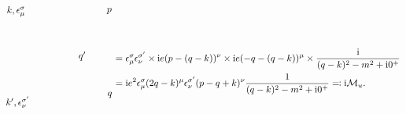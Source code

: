 \begin{equation}
\begin{gathered}
\begin{tikzpicture}[x=0.75pt,y=0.75pt,yscale=-1,xscale=1]
            \draw (257,73.27) node [anchor=south west] [inner sep=0.75pt]    {$p$};
            \draw (258,181.57) node [anchor=north west][inner sep=0.75pt]    {$q$};
            \draw (217,124.4) node [anchor=north west][inner sep=0.75pt]    {$q'$};
            \draw (144,77.27) node [anchor=south east] [inner sep=0.75pt]    {$k,\epsilon _{\mu }^{\sigma }$};
            \draw (150,188.07) node [anchor=north east] [inner sep=0.75pt]    {$k',\epsilon _{\nu }^{\sigma '}$};
            \end{tikzpicture}            
    \end{gathered} 
    \begin{aligned}[t]
        &= \epsilon^\sigma_\mu \epsilon^{\sigma'}_\nu \times \ii e (p - (q-k))^\nu \times \ii e (- q - (q-k))^\mu \times \frac{\ii}{(q-k)^2 - m^2 + \ii 0^+} \\
        &= \ii e^2 \epsilon^\sigma_\mu (2q-k)^\mu \epsilon^{\sigma'}_\nu (p-q+k)^\nu \frac{1}{(q-k)^2 - m^2 + \ii 0^+} \eqqcolon \ii \mathcal{M}_u.
    \end{aligned}
\end{equation}
